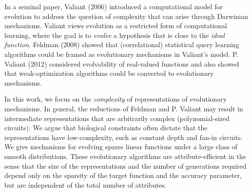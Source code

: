 In a seminal paper, Valiant (2006) introduced a computational model for
evolution to address the question of complexity that can arise through Darwinian
mechanisms. Valiant views evolution as a restricted form of computational
learning, where the goal is to \emph{evolve} a hypothesis that is close to the
\emph{ideal function}. Feldman (2008) showed that (correlational) statistical
query learning algorithms
could be framed as evolutionary mechanisms in Valiant's model. P. Valiant (2012)
considered evolvability of real-valued functions and also showed that
weak-optimization algorithms could be converted to evolutionary mechanisms.

In this work, we focus on the \emph{complexity} of representations of
evolutionary mechanisms. In general, the reductions of Feldman and P. Valiant
may result in intermediate representations that are arbitrarily complex
(polynomial-sized circuits). We argue that biological constraints often dictate
that the representations have low-complexity, such as constant depth and fan-in
circuits. We give mechanisms for evolving sparse linear functions under a large
class of smooth distributions. These evolutionary algorithms are
attribute-efficient in the sense that the size of the representations and the
number of generations required depend only on the sparsity of the target
function and the accuracy parameter, but are independent of the total number of
attributes.
